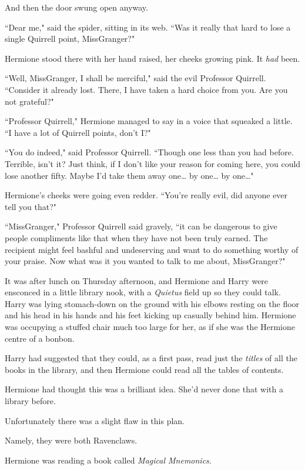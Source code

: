And then the door swung open anyway.

``Dear me," said the spider, sitting in its web. ``Was it really that hard to lose a single Quirrell point, Miss\?Granger?"

Hermione stood there with her hand raised, her cheeks growing pink. It \emph{had} been.

``Well, Miss\?Granger, I shall be merciful," said the evil Professor Quirrell. ``Consider it already lost. There, I have taken a hard choice from you. Are you not grateful?"

``Professor Quirrell," Hermione managed to say in a voice that squeaked a little. ``I have a lot of Quirrell points, don't I?"

``You do indeed," said Professor Quirrell. ``Though one less than you had before. Terrible, isn't it? Just think, if I don't like your reason for coming here, you could lose another fifty. Maybe I'd take them away one{\ldots} by one{\ldots} by one{\ldots}"

Hermione's cheeks were going even redder. ``You're really evil, did anyone ever tell you that?"

``Miss\?Granger," Professor Quirrell said gravely, ``it can be dangerous to give people compliments like that when they have not been truly earned. The recipient might feel bashful and undeserving and want to do something worthy of your praise. Now what was it you wanted to talk to me about, Miss\?Granger?"

\later

It was after lunch on Thursday afternoon, and Hermione and Harry were ensconced in a little library nook, with a \emph{Quietus} field up so they could talk. Harry was lying stomach-down on the ground with his elbows resting on the floor and his head in his hands and his feet kicking up casually behind him. Hermione was occupying a stuffed chair much too large for her, as if she was the Hermione centre of a bonbon.

Harry had suggested that they could, as a first pass, read just the \emph{titles} of all the books in the library, and then Hermione could read all the tables of contents.

Hermione had thought this was a brilliant idea. She'd never done that with a library before.

Unfortunately there was a slight flaw in this plan.

Namely, they were both Ravenclaws.

Hermione was reading a book called \emph{Magical Mnemonics}.

